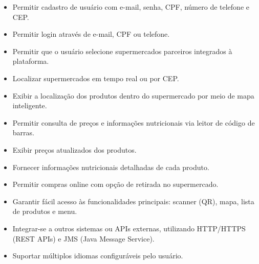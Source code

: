 \begin{itemize}
    \item Permitir cadastro de usuário com e-mail, senha, CPF, número de telefone e CEP.
    \item Permitir login através de e-mail, CPF ou telefone.
    \item Permitir que o usuário selecione supermercados parceiros integrados à plataforma.
    \item Localizar supermercados em tempo real ou por CEP.
    \item Exibir a localização dos produtos dentro do supermercado por meio de mapa inteligente.
    \item Permitir consulta de preços e informações nutricionais via leitor de código de barras.
    \item Exibir preços atualizados dos produtos.
    \item Fornecer informações nutricionais detalhadas de cada produto.
    \item Permitir compras online com opção de retirada no supermercado.
    \item Garantir fácil acesso às funcionalidades principais: scanner (QR), mapa, lista de produtos e menu.
    \item Integrar-se a outros sistemas ou APIs externas, utilizando HTTP/HTTPS (REST APIs) e JMS (Java Message Service).
    \item Suportar múltiplos idiomas configuráveis pelo usuário.
\end{itemize}